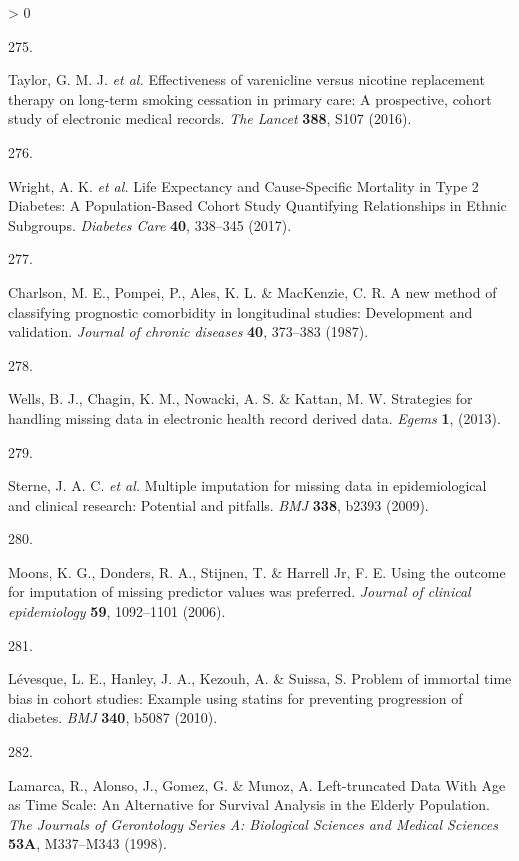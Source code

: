 \documentclass[a4paper, twoside]{templates/ociamthesis}
\newlength{\cslhangindent}
\newlength{\csllabelwidth}
\newenvironment{CSLReferences}[3] %
 {%
  \setlength{\parindent}{0pt}
  \ifodd #1 \everypar{\setlength{\hangindent}{\cslhangindent}}\ignorespaces\fi
  \ifnum #2 > 0
  \setlength{\parskip}{#2\baselineskip}
  \fi
 }%
 {}
\newcommand{\CSLLeftMargin}[1]{\parbox[t]{\maxof{\widthof{#1}}{\csllabelwidth}}{#1}}
\newcommand{\CSLRightInline}[1]{\parbox[t]{\linewidth - \csllabelwidth}{#1}}
\begin{document}
\begin{CSLReferences}{0}{0}
\leavevmode\hypertarget{ref-taylor2016}{}%
\CSLLeftMargin{275. }
\CSLRightInline{Taylor, G. M. J. \emph{et al.} Effectiveness of varenicline versus nicotine replacement therapy on long-term smoking cessation in primary care: A prospective, cohort study of electronic medical records. \emph{The Lancet} \textbf{388}, S107 (2016).}

\leavevmode\hypertarget{ref-wright2017}{}%
\CSLLeftMargin{276. }
\CSLRightInline{Wright, A. K. \emph{et al.} Life {Expectancy} and {Cause}-{Specific Mortality} in {Type} 2 {Diabetes}: A {Population}-{Based Cohort Study Quantifying Relationships} in {Ethnic Subgroups}. \emph{Diabetes Care} \textbf{40}, 338--345 (2017).}

\leavevmode\hypertarget{ref-charlson1987new}{}%
\CSLLeftMargin{277. }
\CSLRightInline{Charlson, M. E., Pompei, P., Ales, K. L. \& MacKenzie, C. R. A new method of classifying prognostic comorbidity in longitudinal studies: Development and validation. \emph{Journal of chronic diseases} \textbf{40}, 373--383 (1987).}

\leavevmode\hypertarget{ref-wells2013strategies}{}%
\CSLLeftMargin{278. }
\CSLRightInline{Wells, B. J., Chagin, K. M., Nowacki, A. S. \& Kattan, M. W. Strategies for handling missing data in electronic health record derived data. \emph{Egems} \textbf{1}, (2013).}

\leavevmode\hypertarget{ref-sterne2009}{}%
\CSLLeftMargin{279. }
\CSLRightInline{Sterne, J. A. C. \emph{et al.} Multiple imputation for missing data in epidemiological and clinical research: Potential and pitfalls. \emph{BMJ} \textbf{338}, b2393 (2009).}

\leavevmode\hypertarget{ref-moons2006using}{}%
\CSLLeftMargin{280. }
\CSLRightInline{Moons, K. G., Donders, R. A., Stijnen, T. \& Harrell Jr, F. E. Using the outcome for imputation of missing predictor values was preferred. \emph{Journal of clinical epidemiology} \textbf{59}, 1092--1101 (2006).}

\leavevmode\hypertarget{ref-levesque2010}{}%
\CSLLeftMargin{281. }
\CSLRightInline{Lévesque, L. E., Hanley, J. A., Kezouh, A. \& Suissa, S. Problem of immortal time bias in cohort studies: Example using statins for preventing progression of diabetes. \emph{BMJ} \textbf{340}, b5087 (2010).}

\leavevmode\hypertarget{ref-lamarca1998}{}%
\CSLLeftMargin{282. }
\CSLRightInline{Lamarca, R., Alonso, J., Gomez, G. \& Munoz, A. Left-truncated {Data With Age} as {Time Scale}: An {Alternative} for {Survival Analysis} in the {Elderly Population}. \emph{The Journals of Gerontology Series A: Biological Sciences and Medical Sciences} \textbf{53A}, M337--M343 (1998).}


\end{CSLReferences}
\end{document}
